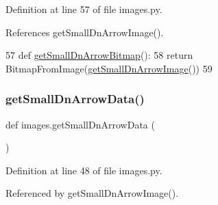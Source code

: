 Definition at line 57 of file images.\+py.



References get\+Small\+Dn\+Arrow\+Image().


\begin{DoxyCode}
57 \textcolor{keyword}{def }\hyperlink{namespaceimages_a5aa232215269c0c30d855391625bfd12}{getSmallDnArrowBitmap}():
58     \textcolor{keywordflow}{return} BitmapFromImage(\hyperlink{namespaceimages_abf96ea60e0ea4e77a1f9a76391236a32}{getSmallDnArrowImage}())
59 
\end{DoxyCode}
\mbox{\label{namespaceimages_a091ab95dfeb4f06de7c2eb0bab3a6278}} 
\subsubsection{\texorpdfstring{get\+Small\+Dn\+Arrow\+Data()}{getSmallDnArrowData()}}
{\footnotesize\ttfamily def images.\+get\+Small\+Dn\+Arrow\+Data (\begin{DoxyParamCaption}{ }\end{DoxyParamCaption})}



Definition at line 48 of file images.\+py.



Referenced by get\+Small\+Dn\+Arrow\+Image().


